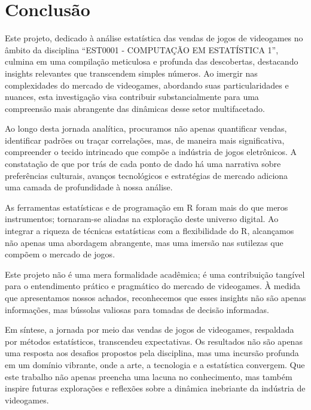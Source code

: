 \documentclass[draft]{agujournal2018}
\begin{document}
\section{Conclusão}

Este projeto, dedicado à análise estatística das vendas de jogos de
videogames no âmbito da disciplina ``EST0001 - COMPUTAÇÃO EM ESTATÍSTICA
1'', culmina em uma compilação meticulosa e profunda das descobertas,
destacando insights relevantes que transcendem simples números. Ao
imergir nas complexidades do mercado de videogames, abordando suas
particularidades e nuances, esta investigação visa contribuir
substancialmente para uma compreensão mais abrangente das dinâmicas
desse setor multifacetado.

Ao longo desta jornada analítica, procuramos não apenas quantificar
vendas, identificar padrões ou traçar correlações, mas, de maneira mais
significativa, compreender o tecido intrincado que compõe a indústria de
jogos eletrônicos. A constatação de que por trás de cada ponto de dado
há uma narrativa sobre preferências culturais, avanços tecnológicos e
estratégias de mercado adiciona uma camada de profundidade à nossa
análise.

As ferramentas estatísticas e de programação em R foram mais do que
meros instrumentos; tornaram-se aliadas na exploração deste universo
digital. Ao integrar a riqueza de técnicas estatísticas com a
flexibilidade do R, alcançamos não apenas uma abordagem abrangente, mas
uma imersão nas sutilezas que compõem o mercado de jogos.

Este projeto não é uma mera formalidade acadêmica; é uma contribuição
tangível para o entendimento prático e pragmático do mercado de
videogames. À medida que apresentamos nossos achados, reconhecemos que
esses insights não são apenas informações, mas bússolas valiosas para
tomadas de decisão informadas.

Em síntese, a jornada por meio das vendas de jogos de videogames,
respaldada por métodos estatísticos, transcendeu expectativas. Os
resultados não são apenas uma resposta aos desafios propostos pela
disciplina, mas uma incursão profunda em um domínio vibrante, onde a
arte, a tecnologia e a estatística convergem. Que este trabalho não
apenas preencha uma lacuna no conhecimento, mas também inspire futuras
explorações e reflexões sobre a dinâmica inebriante da indústria de
videogames.


\end{document}
